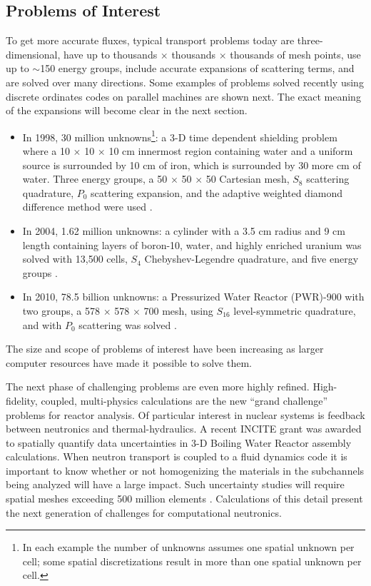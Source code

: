 \subsection{Problems of Interest}
To get more accurate fluxes, typical transport problems today are three-dimensional, have up to thousands $\times$ thousands $\times$ thousands of mesh points, use up to $\sim$150 energy groups, include accurate expansions of scattering terms, and are solved over many directions. Some examples of problems solved recently using discrete ordinates codes on parallel machines are shown next. The exact meaning of the expansions will become clear in the next section.
\begin{itemize}
  \item In 1998, 30 million unknowns\footnote{In each example the number of unknowns assumes one spatial unknown per cell; some spatial discretizations result in more than one spatial unknown per cell.}: a 3-D time dependent shielding problem where a 10 $\times$ 10 $\times$ 10 cm innermost region containing water and a uniform source is surrounded by 10 cm of iron, which is surrounded by 30 more cm of water. Three energy groups, a 50 $\times$ 50 $\times$ 50 Cartesian mesh, $S_{8}$ scattering quadrature, $P_{0}$ scattering expansion, and the adaptive weighted diamond difference method were used \cite{Alcouffe1998}.
  \item In 2004, 1.62 million unknowns: a cylinder with a 3.5 cm radius and 9 cm length containing layers of boron-10, water, and highly enriched uranium was solved with 13,500 cells, $S_{4}$ Chebyshev-Legendre quadrature, and five energy groups \cite{Warsa2004a}. 
  \item In 2010, 78.5 billion unknowns: a Pressurized Water Reactor (PWR)-900 with two groups, a 578 $\times$ 578 $\times$ 700 mesh, using $S_{16}$ level-symmetric quadrature, and with $P_{0}$ scattering was solved \cite{Davidson2010}. 
\end{itemize}
%
The size and scope of problems of interest have been increasing as larger computer resources have made it possible to solve them. 

The next phase of challenging problems are even more highly refined. High-fidelity, coupled, multi-physics calculations are the new ``grand challenge'' problems for reactor analysis. Of particular interest in nuclear systems is feedback between neutronics and thermal-hydraulics. A recent INCITE grant was awarded to spatially quantify data uncertainties in 3-D Boiling Water Reactor assembly calculations. When neutron transport is coupled to a fluid dynamics code it is important to know whether or not homogenizing the materials in the subchannels being analyzed will have a large impact. Such uncertainty studies will require spatial meshes exceeding 500 million elements \cite{Evans2009a}. Calculations of this detail present the next generation of challenges for computational neutronics. 

